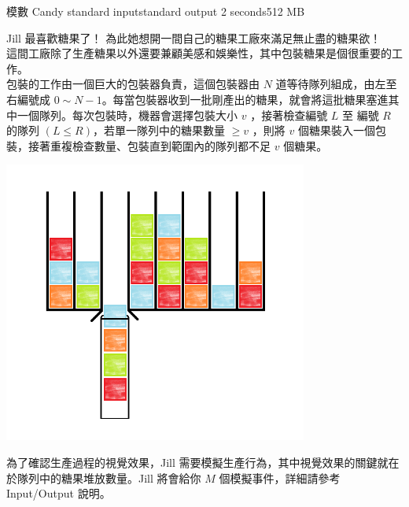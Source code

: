 \gdef\thisproblemauthor{}
\gdef\thisproblemdeveloper{}
\gdef\thisproblemorigin{}
\begin{problem}{模數 Candy} %
{standard input}{standard output}
{2 seconds}{512 MB}{}

Jill 最喜歡糖果了！\newline
為此她想開一間自己的糖果工廠來滿足無止盡的糖果欲！\\
\newline
這間工廠除了生產糖果以外還要兼顧美感和娛樂性，其中包裝糖果是個很重要的工作。\\
包裝的工作由一個巨大的包裝器負責，這個包裝器由 $N$ 道等待隊列組成，由左至右編號成 $0 \sim N-1$。每當包裝器收到一批剛產出的糖果，就會將這批糖果塞進其中一個隊列。每次包裝時，機器會選擇包裝大小 $v$ ，接著檢查編號 $L$ 至 編號 $R$ 的隊列 $(L\leq R)$，若單一隊列中的糖果數量 $ \geq v $ ，則將 $v$ 個糖果裝入一個包裝，接著重複檢查數量、包裝直到範圍內的隊列都不足 $v$ 個糖果。\\
\centerline{\includegraphics[height=25em]{./pics/E-1.png}}
\newline
為了確認生產過程的視覺效果，Jill 需要模擬生產行為，其中視覺效果的關鍵就在於隊列中的糖果堆放數量。Jill 將會給你 $M$ 個模擬事件，詳細請參考 Input/Output 說明。\\
\newline
\InputFile


\end{problem}
